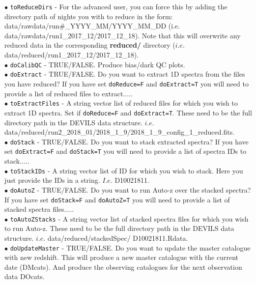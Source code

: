 \documentclass[12pt]{article}
\begin{document}
$\bullet$ \texttt{toReduceDirs}  - For the advanced user, you can force this by adding the directory path of nights you with to reduce in the form: data/rawdata/run\#\_YYYY\_MM/YYYY\_MM\_DD (i.e. data/rawdata/run1\_2017\_12/2017\_12\_18). Note that this will overwrite any reduced data in the corresponding \textbf{reduced/} directory ($i.e.$ data/reduced/run1\_2017\_12/2017\_12\_18).    \\

$\bullet$ \texttt{doCalibQC} - TRUE/FALSE. Produce bias/dark QC plots.\\

$\bullet$ \texttt{doExtract} - TRUE/FALSE. Do you want to extract 1D spectra from the files you have reduced? If you have set \texttt{doReduce=F} and \texttt{doExtract=T} you will need to provide a list of reduced files to extract..... \\

$\bullet$ \texttt{toExtractFiles} - A string vector list of reduced files for which you wish to extract 1D spectra. Set if \texttt{doReduce=F} and \texttt{doExtract=T}. These need to be the full directory path in the DEVILS data structure. $i.e.$ data/reduced/run2\_2018\_01/2018\_1\_9/2018\_1\_9\_config\_1\_reduced.fits. \\

$\bullet$ \texttt{doStack} - TRUE/FALSE. Do you want to stack extracted spectra? If you have set \texttt{doExtract=F} and \texttt{doStack=T} you will need to provide a list of spectra IDs to stack..... \\

$\bullet$ \texttt{toStackIDs} - A string vector list of ID for which you wish to stack. Here you just provide the IDs in a string. $I.e.$ D10021811.\\

$\bullet$ \texttt{doAutoZ} - TRUE/FALSE. Do you want to run Auto-z over the stacked spectra? If you have set \texttt{doStack=F} and \texttt{doAutoZ=T} you will need to provide a list of stacked spectra files..... \\

$\bullet$ \texttt{toAutoZStacks} - A string vector list of stacked spectra files for which you wish to run Auto-z. These need to be the full directory path in the DEVILS data structure. $i.e.$ data/reduced/stackedSpec/ D10021811.Rdata. \\

$\bullet$ \texttt{doUpdateMaster} - TRUE/FALSE. Do you want to update the master catalogue with new redshift. This will produce a new master catalogue with the current date (DMcats). And produce the observing catalogues for the next observation data DOcats. \\ 
\end{document}
